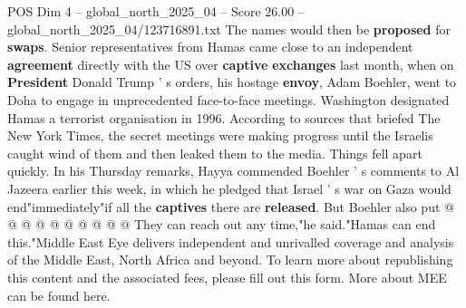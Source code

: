 \begin{textsample}{POS Dim 4 – global\_north\_2025\_04 – Score 26.00 – global\_north\_2025\_04/123716891.txt}
The names would then be \textbf{proposed} for \textbf{swaps}.
Senior representatives from Hamas came close to an independent \textbf{agreement} directly with the US over \textbf{captive} \textbf{exchanges} last month, when on \textbf{President} Donald Trump ' s orders, his hostage \textbf{envoy}, Adam Boehler, went to Doha to engage in unprecedented face-to-face meetings.
Washington designated Hamas a terrorist organisation in 1996.
According to sources that briefed The New York Times, the secret meetings were making progress until the Israelis caught wind of them and then leaked them to the media.
Things fell apart quickly.
In his Thursday remarks, Hayya commended Boehler ' s comments to Al Jazeera earlier this week, in which he pledged that Israel ' s war on Gaza would end"immediately"if all the \textbf{captives} there are \textbf{released}.
But Boehler also put @ @ @ @ @ @ @ @ @ @ They can reach out any time,"he said."Hamas can end this."Middle East Eye delivers independent and unrivalled coverage and analysis of the Middle East, North Africa and beyond.
To learn more about republishing this content and the associated fees, please fill out this form.
More about MEE can be found here.

\end{textsample}
